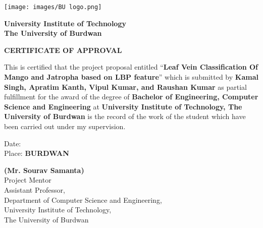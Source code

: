 \documentclass{report}
\begin{document}
\begin{titlepage}
    \centering
    \texttt{[image: images/BU logo.png]}\\ %
    \vspace{1cm}
    
    \textbf{University Institute of Technology}\\
    \textbf{The University of Burdwan}

    \vspace{1cm}
    
    \textbf{\huge CERTIFICATE OF APPROVAL}
    
    \vspace{0.5cm}
    
    \onehalfspacing
    \noindent
    \begin{justify} 
    This is certified that the project proposal entitled “\textbf{Leaf Vein Classification Of Mango and Jatropha based on LBP feature}” which is submitted by \textbf{Kamal Singh, Apratim Kanth, Vipul Kumar, and Raushan Kumar} as partial fulfillment for the award of the degree of \textbf{Bachelor of Engineering, Computer Science and Engineering} at \textbf{University Institute of Technology, The University of Burdwan} is the record of the work of the student which have been carried out under my supervision.
    \end{justify}
    \vspace{1cm}
    
    \begin{flushleft}
        Date: \\
        Place: \textbf{BURDWAN}
    \end{flushleft}
    
    \vspace{1.5cm}
    
    \begin{flushright}
        \textbf{(Mr. Sourav Samanta)}\\
        Project Mentor\\
        Assistant Professor,\\
        Department of Computer Science and Engineering,\\
        University Institute of Technology,\\
        The University of Burdwan
    \end{flushright}
    
\end{titlepage}
\end{document}
